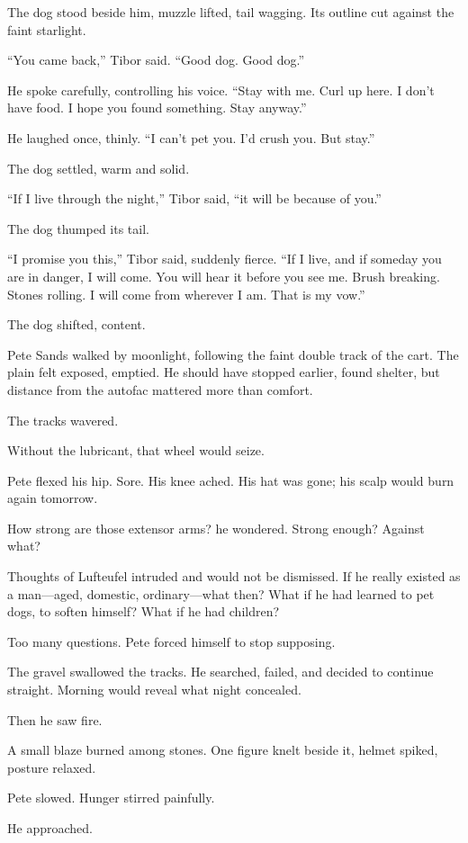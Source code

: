The dog stood beside him, muzzle lifted, tail wagging. Its outline cut against the faint starlight.

“You came back,” Tibor said. “Good dog. Good dog.”

He spoke carefully, controlling his voice. “Stay with me. Curl up here. I don’t have food. I hope you found something. Stay anyway.”

He laughed once, thinly. “I can’t pet you. I’d crush you. But stay.”

The dog settled, warm and solid.

“If I live through the night,” Tibor said, “it will be because of you.”

The dog thumped its tail.

“I promise you this,” Tibor said, suddenly fierce. “If I live, and if someday you are in danger, I will come. You will hear it before you see me. Brush breaking. Stones rolling. I will come from wherever I am. That is my vow.”

The dog shifted, content.

Pete Sands walked by moonlight, following the faint double track of the cart. The plain felt exposed, emptied. He should have stopped earlier, found shelter, but distance from the autofac mattered more than comfort.

The tracks wavered.

Without the lubricant, that wheel would seize.

Pete flexed his hip. Sore. His knee ached. His hat was gone; his scalp would burn again tomorrow.

How strong are those extensor arms? he wondered. Strong enough? Against what?

Thoughts of Lufteufel intruded and would not be dismissed. If he really existed as a man—aged, domestic, ordinary—what then? What if he had learned to pet dogs, to soften himself? What if he had children?

Too many questions. Pete forced himself to stop supposing.

The gravel swallowed the tracks. He searched, failed, and decided to continue straight. Morning would reveal what night concealed.

Then he saw fire.

A small blaze burned among stones. One figure knelt beside it, helmet spiked, posture relaxed.

Pete slowed. Hunger stirred painfully.

He approached.

